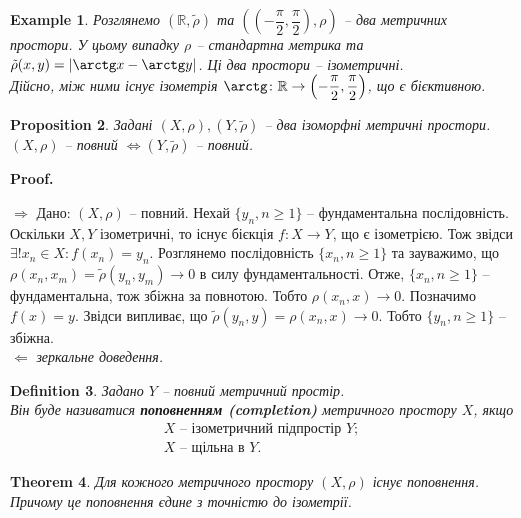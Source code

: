 \documentclass[a4paper, 10pt]{article}
\makeatletter
\def\rightproof{$\boxed{\Rightarrow}$ }
\def\leftproof{$\boxed{\Leftarrow}$ }
\theoremstyle{theoremdd}
\newtheorem{theorem}{Theorem}[subsection]
\theoremstyle{theoremdd}
\newtheorem{definition}[theorem]{Definition}
\theoremstyle{theoremdd}
\theoremstyle{theoremdd}
\newtheorem{example}[theorem]{Example}
\theoremstyle{theoremdd}
\newtheorem{proposition}[theorem]{Proposition}
\theoremstyle{theoremdd}
\theoremstyle{theoremdd}
\theoremstyle{theoremdd}
\renewenvironment{proof}[1][Proof.\\]{\par
\pushQED{\hfill \qed}%
\normalfont \topsep6\p@\@plus6\p@\relax
\trivlist
\item\relax
{\bfseries
#1\@addpunct{.}}\hspace\labelsep\ignorespaces
}{%
\popQED\endtrivlist\@endpefalse
}
\makeatother
\begin{document}
\begin{example}
Розглянемо $(\mathbb{R}, \tilde{\rho})$ та $\left( \left( -\dfrac{\pi}{2}, \dfrac{\pi}{2} \right), \rho \right)$ -- два метричних простори. У цьому випадку $\rho$ -- стандартна метрика та $\tilde{\rho}(x,y) = |\arctg x - \arctg y|$. Ці два простори -- ізометричні.\\
Дійсно, між ними існує ізометрія $\arctg \colon \mathbb{R} \to \left( -\dfrac{\pi}{2}, \dfrac{\pi}{2} \right)$, що є бієктивною.
\end{example}

\begin{proposition}
Задані $(X,\rho), (Y, \tilde{\rho})$ -- два ізоморфні метричні простори.\\
$(X,\rho)$ -- повний $\iff (Y,\tilde{\rho})$ -- повний.
\end{proposition}

\begin{proof}
\rightproof Дано: $(X,\rho)$ -- повний. Нехай $\{y_n, n \geq 1\}$ -- фундаментальна послідовність. Оскільки $X,Y$ ізометричні, то існує бієкція $f \colon X \to Y$, що є ізометрією. Тож звідси $\exists !x_n \in X: f(x_n) = y_n$. Розглянемо послідовність $\{x_n, n \geq 1\}$ та зауважимо, що $\rho(x_n,x_m) = \tilde{\rho}(y_n,y_m) \to 0$ в силу фундаментальності. Отже, $\{x_n, n \geq 1\}$ -- фундаментальна, тож збіжна за повнотою. Тобто $\rho(x_n,x) \to 0$. Позначимо $f(x) = y$. Звідси випливає, що $\tilde{\rho}(y_n,y) = \rho(x_n,x) \to 0$. Тобто $\{y_n, n \geq 1\}$ -- збіжна.
\bigskip \\
\leftproof \textit{зеркальне доведення.}
\end{proof}

\begin{definition}
Задано $Y$ -- повний метричний простір.\\
Він буде називатися \textbf{поповненням (completion)} метричного простору $X$, якщо
\begin{align*}
X \text{ -- ізометричний підпростір } Y; \\
X \text{ -- щільна в } Y.
\end{align*}
\end{definition}

\begin{theorem}
Для кожного метричного простору $(X,\rho)$ існує поповнення. Причому це поповнення єдине з точністю до ізометрії.
\end{theorem}
\end{document}
